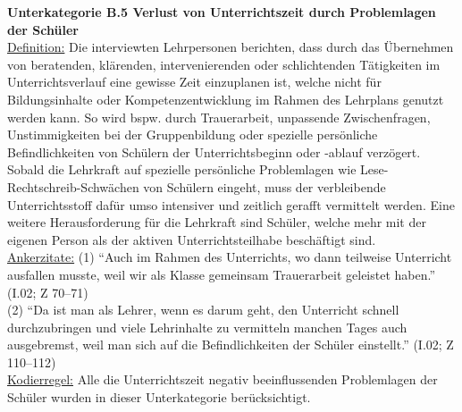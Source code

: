 \noindent
\textbf{Unterkategorie B.5 Verlust von Unterrichtszeit durch Problemlagen der Schüler}\\
\underline{Definition:} Die interviewten Lehrpersonen berichten, dass durch das Übernehmen von beratenden, klärenden, intervenierenden oder schlichtenden Tätigkeiten im Unterrichtsverlauf eine gewisse Zeit einzuplanen ist, welche nicht für Bildungsinhalte oder Kompetenzentwicklung im Rahmen des Lehrplans genutzt werden kann. So wird bspw. durch Trauerarbeit, unpassende Zwischenfragen, Unstimmigkeiten bei der Gruppenbildung oder spezielle persönliche Befindlichkeiten von Schülern der Unterrichtsbeginn oder -ablauf verzögert. Sobald die Lehrkraft auf spezielle persönliche Problemlagen wie Lese-Rechtschreib-Schwächen von Schülern eingeht, muss der verbleibende Unterrichtsstoff dafür umso intensiver und zeitlich gerafft vermittelt werden. Eine weitere Herausforderung für die Lehrkraft sind Schüler, welche mehr mit der eigenen Person als der aktiven Unterrichtsteilhabe beschäftigt sind.\\
\underline{Ankerzitate:} (1) "`Auch im Rahmen des Unterrichts, wo dann teilweise Unterricht ausfallen musste, weil wir als Klasse gemeinsam Trauerarbeit geleistet haben."' (I.02; Z 70--71)\\ (2) "`Da ist man als Lehrer, wenn es darum geht, den Unterricht schnell durchzubringen und viele Lehrinhalte zu vermitteln manchen Tages auch ausgebremst, weil man sich auf die Befindlichkeiten der Schüler einstellt."' (I.02; Z 110--112)\\
\underline{Kodierregel:} Alle die Unterrichtszeit negativ beeinflussenden Problemlagen der Schüler wurden in dieser Unterkategorie berücksichtigt.\\

